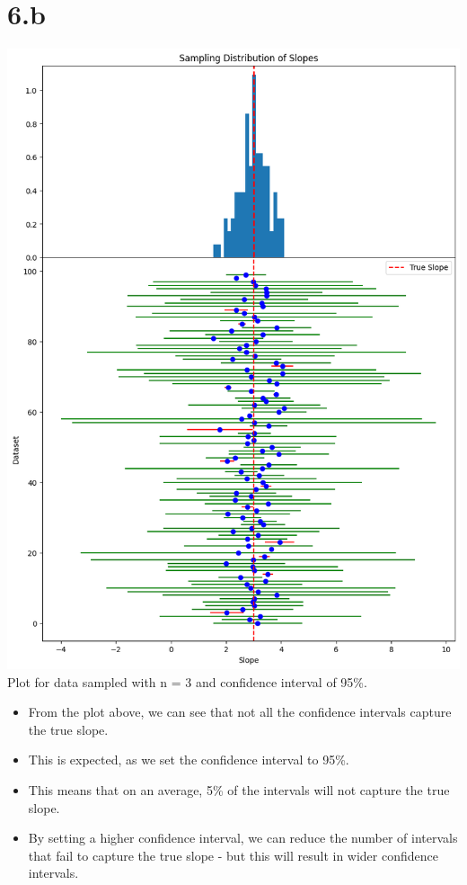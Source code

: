\documentclass[12pt]{article}
\begin{document}
\section*{6.b}
\includegraphics*[width=\linewidth]{graph6b}
Plot for data sampled with n = 3 and confidence interval of 95\%.
\begin{itemize}
    \item From the plot above, we can see that not all the confidence intervals
    capture the true slope.
    \item This is expected, as we set the confidence interval to 95\%.
    \item This means that on an average, 5\% of the intervals will not capture
    the true slope.
    \item By setting a higher confidence interval, we can reduce the number of
    intervals that fail to capture the true slope - but this will result in
    wider confidence intervals.
\end{itemize}
\end{document}
